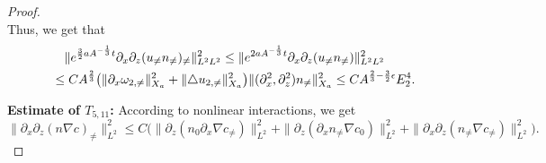 \documentclass[12pt, reqno]{amsart}
\numberwithin{equation}{section}
\begin{document}
\begin{proof}
\begin{equation*}
		\end{equation*}	
		Thus,  we get that 
		\begin{equation*}
			\begin{aligned}
				&\quad\|{\rm e}^{\frac32aA^{-\frac{1}{3}}t}
				\partial_x\partial_z(u_{\neq}n_{\neq})_{\neq}\|^2_{L^2L^2}
				\leq 
				\|{\rm e}^{2aA^{-\frac{1}{3}}t}
				\partial_x\partial_z(u_{\neq}n_{\neq})\|^2_{L^2L^2}\\
				&\leq CA^{\frac23}\big(\|\partial_x\omega_{2,\neq}\|^2_{X_a}
				+\|\triangle u_{2,\neq}\|_{X_a}^2\big)
				\|(\partial_x^2,\partial_z^2)n_{\neq}\|^2_{X_a}\leq CA^{\frac23-\frac32\epsilon}E_2^4.
			\end{aligned}
		\end{equation*} 
		
		\noindent\textbf{Estimate of $T_{5,11}$:}
		According to nonlinear interactions, we get
		\begin{equation*}
			\|\partial_x\partial_z(n\nabla c)_{\neq}\|^2_{L^2}\leq C
			\big(\|\partial_z(n_0\partial_x\nabla c_{\neq})\|^2_{L^2}+
			\|\partial_z(\partial_xn_{\neq}\nabla c_{0})\|^2_{L^2}+
			\|\partial_x\partial_z(n_{\neq}\nabla c_{\neq})\|^2_{L^2}\big).
		\end{equation*}
		

\end{proof}
\end{document}
